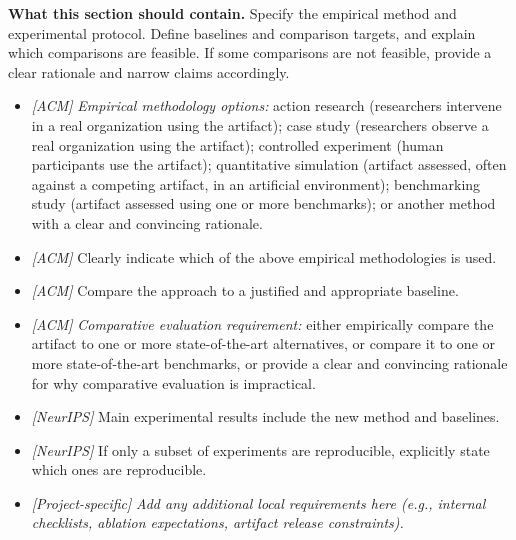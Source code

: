 \noindent\textbf{What this section should contain.}
Specify the empirical method and experimental protocol. Define baselines and comparison targets, and explain which comparisons are feasible.
If some comparisons are not feasible, provide a clear rationale and narrow claims accordingly.

\begin{itemize}
  \item \textit{[ACM]} \emph{Empirical methodology options:} action research (researchers intervene in a real organization using the artifact);
  case study (researchers observe a real organization using the artifact); controlled experiment (human participants use the artifact);
  quantitative simulation (artifact assessed, often against a competing artifact, in an artificial environment);
  benchmarking study (artifact assessed using one or more benchmarks); or another method with a clear and convincing rationale.

  \item \textit{[ACM]} Clearly indicate which of the above empirical methodologies is used.

  \item \textit{[ACM]} Compare the approach to a justified and appropriate baseline.

  \item \textit{[ACM]} \emph{Comparative evaluation requirement:} either empirically compare the artifact to one or more state-of-the-art alternatives,
  or compare it to one or more state-of-the-art benchmarks, or provide a clear and convincing rationale for why comparative evaluation is impractical.

  \item \textit{[NeurIPS]} Main experimental results include the new method and baselines.

  \item \textit{[NeurIPS]} If only a subset of experiments are reproducible, explicitly state which ones are reproducible.

  \item \textit{[Project-specific]} \emph{Add any additional local requirements here (e.g., internal checklists, ablation expectations, artifact release constraints).}
\end{itemize}
